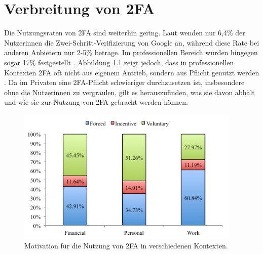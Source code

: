 \chapter{Verbreitung von \acl{2FA}}

Die Nutzungsraten von \ac{2FA} sind weiterhin gering. Laut \textcite{petsasTwofactorAuthentication2015} wenden nur 6,4\% der Nutzerinnen die Zwei-Schritt-Verifizierung von Google an, während diese Rate bei anderen Anbietern nur 2-5\% betrage. Im professionellen Bereich wurden hingegen sogar 17\% festgestellt \parencite{ackermanImpedimentsAdoption2020}. Abbildung \ref{fig:motivation} zeigt jedoch, dass in professionellen Kontexten \ac{2FA} oft nicht aus eigenem Antrieb, sondern aus Pflicht genutzt werden \parencite{decristofaroComparativeUsability2014}. Da im Privaten eine \ac{2FA}-Pflicht schwieriger durchzusetzen ist, insbesondere ohne die Nutzerinnen zu vergraulen, gilt es herauszufinden, was sie davon abhält und wie sie zur Nutzung von \ac{2FA} gebracht werden können.

\begin{figure}
  \begin{center}
    \includegraphics[width=0.95\textwidth]{assets/motivation.png}
  \end{center}
  \caption[Motivation für die Nutzung von \acs{2FA} in verschiedenen Kontexten]{Motivation für die Nutzung von \acs{2FA} in verschiedenen Kontexten.\\\parencite[6]{decristofaroComparativeUsability2014}}
  \label{fig:motivation}
\end{figure}


